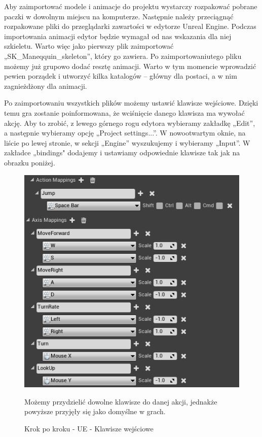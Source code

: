 \documentclass[openright]{xmgr}
\begin{document}
Aby zaimportować modele i animacje do projektu wystarczy rozpakować pobrane paczki w dowolnym miejscu na komputerze. Następnie należy przeciągnąć rozpakowane pliki do przeglądarki zawartości w edytorze Unreal Engine. Podczas importowania animacji edytor będzie wymagał od nas wskazania dla niej szkieletu. Warto więc jako pierwszy plik zaimportować „SK\_Maneqquin\_skeleton”, który go zawiera. Po zaimportowaniutego pliku możemy już grupowo dodać resztę animacji. Warto w tym momencie wprowadzić pewien porządek i utworzyć kilka katalogów – główny dla postaci, a w nim zagnieżdżony dla animacji.

Po zaimportowaniu wszystkich plików możemy ustawić klawisze wejściowe. Dzięki temu gra zostanie poinformowana, że wciśnięcie danego klawisza ma wywołać akcję. Aby to zrobić, z lewego górnego rogu edytora wybieramy zakładkę „Edit”, a następnie wybieramy opcję „Project settings...”. W nowootwartym oknie, na liście po lewej stronie, w sekcji „Engine” wyszukujemy i wybieramy „Input”. W zakładce „bindings" dodajemy i ustawiamy odpowiednie klawisze tak jak na obrazku poniżej.

\newpage
\begin{figure}[!htb]
    \begin{center}
    \includegraphics[scale=0.75]{Screeny/UeKrokPoKroku/UE-Inputs.png}
    \end{center}
    \caption{Krok po kroku - UE - Klawisze wejściowe}
     Możemy przydzielić dowolne klawisze do danej akcji, jednakże powyższe przyjęły się jako domyślne w grach.
\end{figure}
\end{document}
